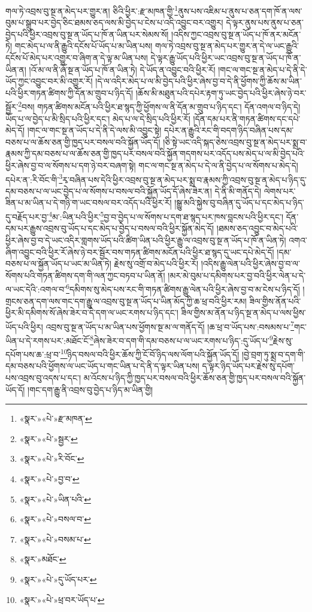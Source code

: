 གལ་ཏེ་འབྲས་བུ་སྔ་ན་མེད་པར་གྱུར་ན། ཅིའི་ཕྱིར་:རྫ་མཁན་གྱི་\footnote{«སྣར་»«པེ་»རྫ་མཁན་}ནུས་པས་འཇིམ་པ་ནུས་པ་ཅན་དག་ཁོ་ན་ལས་བུམ་པ་སྒྲུབ་པར་བྱེད་ཅིང་ཐམས་ཅད་ལས་མི་བྱེད་པ་ངེས་པ་འདི་འབྱུང་བར་འགྱུར། དེ་ལྟར་ནུས་པས་ནུས་པ་ཅན་བྱེད་པའི་ཕྱིར་འབྲས་བུ་སྔ་ན་ཡོད་པ་ཁོ་ན་ཡིན་པར་སེམས་སོ། །འདིས་ཀྱང་འབྲས་བུ་སྔ་ན་ཡོད་པ་ཁོ་ནར་མངོན་ཏེ། གང་མེད་པ་ལ་ནི་རྒྱུའི་དངོས་པོ་ཡོད་པ་མ་ཡིན་པས། གལ་ཏེ་འབྲས་བུ་སྔ་ན་མེད་པར་གྱུར་ན་དེ་ལ་ཡང་རྒྱུའི་དངོས་པོ་མེད་པར་འགྱུར་བ་ཞིག་ན་དེ་ལྟ་མ་ཡིན་པས། དེ་ལྟར་རྒྱུ་ཡོད་པའི་ཕྱིར་ཡང་འབྲས་བུ་སྔ་ན་ཡོད་པ་ཁོ་ན་ཡིན་ན། །འོ་མ་ལ་ནི་ཞོ་སྔ་ན་ཡོད་པ་ཁོ་ན་ཡིན་ཏེ། དེ་ཡོད་ན་འབྱུང་བའི་ཕྱིར་རོ། །གང་ལ་གང་སྔ་ན་མེད་པ་དེ་ནི་དེ་ཡོད་ཀྱང་འབྱུང་བར་མི་འགྱུར་རོ། །དེ་ལ་འདིར་མེད་པ་ལ་མི་བྱེད་པའི་ཕྱིར་ཞེས་བྱ་བ་དེ་ནི་ཕྱོགས་ཀྱི་ཆོས་མ་ཡིན་པའི་ཕྱིར་གཏན་ཚིགས་ཀྱི་དོན་མ་གྲུབ་པ་ཉིད་དོ། །ཆོས་མི་མཐུན་པའི་དཔེར་རྟག་ཏུ་ཡང་བྱེད་པའི་ཕྱིར་ཞེས་ཉེ་བར་སྦྱོར་\footnote{«སྣར་»«པེ་»སྦྱར་}བས། གཏན་ཚིགས་མངོན་པའི་ཕྱིར་ཐ་སྙད་ཀྱི་ཕྱོགས་ལ་ནི་དོན་མ་གྲུབ་པ་ཉིད་དང་། དོན་འགལ་བ་ཉིད་དེ། ཡོད་པ་ལ་བྱེད་པ་མི་སྲིད་པའི་ཕྱིར་དང་། མེད་པ་ལ་དེ་སྲིད་པའི་ཕྱིར་རོ། །དོན་དམ་པར་ནི་གཏན་ཚིགས་དང་དཔེ་མེད་དོ། །གང་ལ་གང་སྔ་ན་ཡོད་པ་དེ་ནི་དེ་ལས་མི་འབྱུང་སྟེ། དཔེར་ན་རྒྱུའི་རང་གི་བདག་ཉིད་བཞིན་པས་དམ་བཅས་པ་ལ་ཆོས་ཅན་གྱི་ཁྱད་པར་བསལ་བའི་སྐྱོན་ཡོད་དོ། །ཅི་སྟེ་ཡང་འདི་སྐད་ཅེས་འབྲས་བུ་སྔ་ན་མེད་པར་སྨྲ་བ་རྣམས་ཀྱི་དམ་བཅས་པ་ལ་ཆོས་ཅན་གྱི་ཁྱད་པར་བསལ་བའི་སྐྱོན་གདགས་པར་འདོད་པས་མེད་པ་ལ་མི་བྱེད་པའི་ཕྱིར་ཞེས་བྱ་བ་ལ་སོགས་པ་དག་ཉེ་བར་བཞག་སྟེ། གང་ལ་གང་སྔ་ན་མེད་པ་དེ་ལ་ནི་བྱེད་པ་ལ་སོགས་པ་མེད་དེ། དཔེར་ན་:རི་བོང་གི་\footnote{«སྣར་»«པེ་»རི་བོང་}རྭ་བཞིན་པས་དེའི་ཕྱིར་འབྲས་བུ་སྔ་ན་མེད་པར་སྨྲ་བ་རྣམས་ཀྱི་འབྲས་བུ་སྔ་ན་མེད་པ་ཉིད་དུ་དམ་བཅས་པ་ལ་ཡང་བྱེད་པ་ལ་སོགས་པ་བསལ་བའི་སྐྱོན་ཡོད་དོ་ཞེས་ཟེར་ན། དེ་ནི་མི་གནོད་དེ། ལེགས་པར་ཟིན་པ་མ་ཡིན་པ་དེ་གཉི་ག་ཡང་བསལ་བར་འདོད་པའི་ཕྱིར་རོ། །སྒྱུ་མའི་སྐྱེས་བུ་བཞིན་དུ་ཡོད་པ་དང་མེད་པ་ཉིད་དུ་བརྗོད་པར་བྱ་\footnote{«སྣར་»«པེ་»བྱ་བ་}མ་:ཡིན་པའི་ཕྱིར་\footnote{«སྣར་»«པེ་»ཡིན་པའི་}བྱ་བ་བྱེད་པ་ལ་སོགས་པ་དག་ཐ་སྙད་པར་ཁས་བླངས་པའི་ཕྱིར་དང་། དོན་དམ་པར་རྒྱུས་འབྲས་བུ་ཡོད་པ་དང་མེད་པ་བྱེད་པ་བསལ་བའི་ཕྱིར་སྐྱོན་མེད་དོ། །ཐམས་ཅད་འབྱུང་བ་མེད་པའི་ཕྱིར་ཞེས་བྱ་བ་དེ་ཡང་འདིར་གླགས་ཡོད་པའི་ཚིག་ཡིན་པའི་ཕྱིར་རྒྱུ་ལ་འབྲས་བུ་སྔ་ན་ཡོད་པ་ཁོ་ན་ཡིན་ཏེ། འགའ་ཞིག་འབྱུང་བའི་ཕྱིར་རོ་ཞེས་ཉེ་བར་སྦྱོར་བས་གཏན་ཚིགས་མངོན་པའི་ཕྱིར་ཐ་སྙད་དུ་ཡང་དཔེ་མེད་དོ། །དམ་བཅས་པ་ལ་སྐྱོན་ཡོད་པ་ཡང་མ་ཡིན་ཏེ། རྗེས་སུ་འགྲོ་བ་མེད་པའི་ཕྱིར་རོ། །འདིས་རྒྱུ་ལེན་པའི་ཕྱིར་ཞེས་བྱ་བ་ལ་སོགས་པའི་གཏན་ཚིགས་དག་གི་ལན་ཀྱང་བཏབ་པ་ཡིན་ནོ། །མར་མེ་བུམ་པ་དམིགས་པར་བྱ་བའི་ཕྱིར་ལེན་པ་དེ་ལ་ཡང་དེའི་:འགལ་བ་\footnote{«སྣར་»«པེ་»བསལ་བ་}དམིགས་སུ་མེད་པས་རང་གི་གཏན་ཚིགས་རྒྱུ་ལེན་པའི་ཕྱིར་ཞེས་བྱ་བ་མ་ངེས་པ་ཉིད་དོ། །གྲངས་ཅན་དག་ལས་གང་དག་རྒྱུ་ལ་འབྲས་བུ་སྔ་ན་ཡོད་པ་ཡིན་མོད་ཀྱི་ཆ་ཕྲ་བའི་ཕྱིར་རམ། ཟིལ་གྱིས་ནོན་པའི་ཕྱིར་མི་དམིགས་སོ་ཞེས་ཟེར་བ་དེ་དག་ལ་ཡང་རགས་པ་ཉིད་དང་། ཟིལ་གྱིས་མ་ནོན་པ་ཉིད་སྔ་ན་མེད་པ་ལས་ཕྱིས་ཡོད་པའི་ཕྱིར། འབྲས་བུ་སྔ་ན་ཡོད་པ་མ་ཡིན་པས་ཕྱོགས་སྔ་མ་ལ་གནོད་དོ། །ཆ་ཕྲ་བ་ཡོད་པས་:བསམས་པ་\footnote{«སྣར་»«པེ་»བསམ་པ་}གང་ཡིན་པ་དེ་རགས་པར་:མཐོང་ངོ་\footnote{«སྣར་»མཐོང་}ཞེས་ཟེར་བ་དག་གི་དམ་བཅས་པ་ལ་ཡང་རགས་པ་ཉིད་:དུ་ཡོད་པ་\footnote{«སྣར་»«པེ་»དུ་ཡོད་པར་}རྗེས་སུ་དཔོག་པས་ཆ་:ཕྲ་བ་\footnote{«སྣར་»«པེ་»ཕྲ་བར་ཡོད་པ་}ཉིད་བསལ་བའི་ཕྱིར་ཆོས་ཀྱི་ངོ་བོ་ཉིད་ལས་ལོག་པའི་སྐྱོན་ཡོད་དོ། །བྱེ་བྲག་ཏུ་སྨྲ་བ་དག་གི་དམ་བཅས་པའི་ཕྱོགས་ལ་ཡང་ཡོད་པ་གང་ཡིན་པ་དེ་ནི་ད་ལྟར་ཡིན་པས། ད་ལྟར་ཉིད་ཡོད་པར་རྗེས་སུ་དཔོག་པས་འབྲས་བུ་འདས་པ་དང་། མ་འོངས་པ་ཉིད་ཀྱི་ཁྱད་པར་བསལ་བའི་ཕྱིར་ཆོས་ཅན་གྱི་ཁྱད་པར་བསལ་བའི་སྐྱོན་ཡོད་དོ། །གང་དག་རྒྱུ་ནི་འབྲས་བུ་བྱེད་པ་ཉིད་མ་ཡིན་གྱི། 
